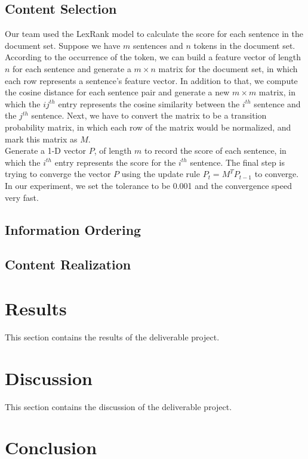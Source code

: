 \documentclass[11pt]{article}
\begin{document}
\subsection{Content Selection}

Our team used the LexRank model to calculate the score for each sentence in the document set. Suppose we have $m$ sentences and $n$ tokens in the document set. According to the occurrence of the token, we can build a feature vector of length $n$ for each sentence and generate a $m\times n$ matrix for the document set, in which each row represents a sentence's feature vector. In addition to that, we compute the cosine distance for each sentence pair and generate a new $m\times m$ matrix, in which the $ij^{th}$ entry represents the cosine similarity between the $i^{th}$ sentence and the $j^{th}$ sentence. Next, we have to convert the matrix to be a transition probability matrix, in which each row of the matrix would be normalized, and mark this matrix as $M$. \\
\indent
Generate a 1-D vector $P$,  of length $m$ to record the score of each sentence, in which the $i^{th}$ entry represents the score for the $i^{th}$ sentence. The final step is trying to converge the vector $P$ using the update rule $P_t = M^T P_{t-1}$ to converge. In our experiment, we set the tolerance to be 0.001 and the convergence speed very fast.

\subsection{Information Ordering}

\subsection{Content Realization}
\section{Results}

This section contains the results of the deliverable project.

\section{Discussion}

This section contains the discussion of the deliverable project.

\section{Conclusion}
\end{document}
